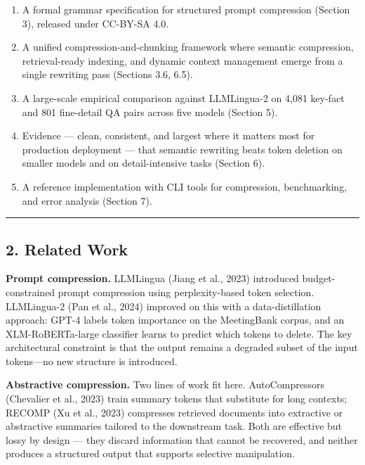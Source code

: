 \documentclass[
]{article}
\providecommand{\tightlist}{%
  \setlength{\itemsep}{0pt}\setlength{\parskip}{0pt}}
\begin{document}
\begin{enumerate}
\def\labelenumi{\arabic{enumi}.}
\tightlist
\item
  A formal grammar specification for structured prompt compression
  (Section 3), released under CC-BY-SA 4.0.
\item
  A unified compression-and-chunking framework where semantic
  compression, retrieval-ready indexing, and dynamic context management
  emerge from a single rewriting pass (Sections 3.6, 6.5).
\item
  A large-scale empirical comparison against LLMLingua-2 on 4,081
  key-fact and 801 fine-detail QA pairs across five models (Section 5).
\item
  Evidence --- clean, consistent, and largest where it matters most for
  production deployment --- that semantic rewriting beats token deletion
  on smaller models and on detail-intensive tasks (Section 6).
\item
  A reference implementation with CLI tools for compression,
  benchmarking, and error analysis (Section 7).
\end{enumerate}

\begin{center}\rule{0.5\linewidth}{0.5pt}\end{center}

\subsection{2. Related Work}\label{related-work}

\textbf{Prompt compression.} LLMLingua (Jiang et al., 2023) introduced
budget-constrained prompt compression using perplexity-based token
selection. LLMLingua-2 (Pan et al., 2024) improved on this with a
data-distillation approach: GPT-4 labels token importance on the
MeetingBank corpus, and an XLM-RoBERTa-large classifier learns to
predict which tokens to delete. The key architectural constraint is that
the output remains a degraded subset of the input tokens---no new
structure is introduced.

\textbf{Abstractive compression.} Two lines of work fit here.
AutoCompressors (Chevalier et al., 2023) train summary tokens that
substitute for long contexts; RECOMP (Xu et al., 2023) compresses
retrieved documents into extractive or abstractive summaries tailored to
the downstream task. Both are effective but lossy by design --- they
discard information that cannot be recovered, and neither produces a
structured output that supports selective manipulation.
\end{document}
